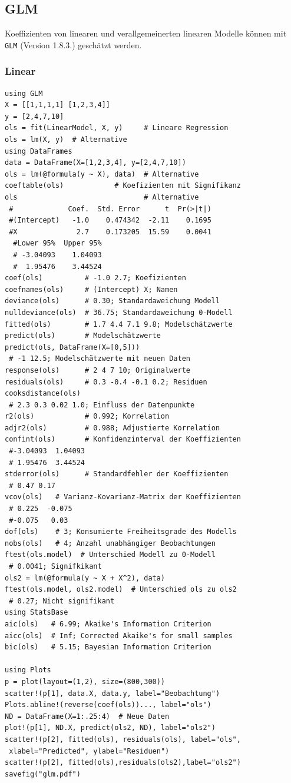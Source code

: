 \documentclass[10pt,twocolumn]{scrartcl}
\begin{document}
\subsection{GLM}

Koeffizienten von linearen und verallgemeinerten linearen Modelle können mit
\lstinline|GLM| (Version 1.8.3.) geschätzt werden.

\subsubsection{Linear}

\begin{lstlisting}
using GLM
X = [[1,1,1,1] [1,2,3,4]]
y = [2,4,7,10]
ols = fit(LinearModel, X, y)     # Lineare Regression
ols = lm(X, y)  # Alternative
using DataFrames
data = DataFrame(X=[1,2,3,4], y=[2,4,7,10])
ols = lm(@formula(y ~ X), data)  # Alternative
coeftable(ols)            # Koefizienten mit Signifikanz
ols                              # Alternative
 #             Coef.  Std. Error      t  Pr(>|t|)
 #(Intercept)   -1.0    0.474342  -2.11    0.1695
 #X              2.7    0.173205  15.59    0.0041
  #Lower 95%  Upper 95%
  # -3.04093    1.04093
  #  1.95476    3.44524
coef(ols)          # -1.0 2.7; Koefizienten
coefnames(ols)     # (Intercept) X; Namen
deviance(ols)      # 0.30; Standardaweichung Modell
nulldeviance(ols)  # 36.75; Standardaweichung 0-Modell
fitted(ols)        # 1.7 4.4 7.1 9.8; Modelschätzwerte
predict(ols)       # Modelschätzwerte
predict(ols, DataFrame(X=[0,5]))
 # -1 12.5; Modelschätzwerte mit neuen Daten
response(ols)      # 2 4 7 10; Originalwerte
residuals(ols)     # 0.3 -0.4 -0.1 0.2; Residuen
cooksdistance(ols)
 # 2.3 0.3 0.02 1.0; Einfluss der Datenpunkte
r2(ols)            # 0.992; Korrelation
adjr2(ols)         # 0.988; Adjustierte Korrelation
confint(ols)       # Konfidenzinterval der Koeffizienten
 #-3.04093  1.04093
 # 1.95476  3.44524
stderror(ols)      # Standardfehler der Koeffizienten
 # 0.47 0.17
vcov(ols)   # Varianz-Kovarianz-Matrix der Koeffizienten
 # 0.225  -0.075
 #-0.075   0.03
dof(ols)    # 3; Konsumierte Freiheitsgrade des Modells
nobs(ols)   # 4; Anzahl unabhängiger Beobachtungen
ftest(ols.model)  # Unterschied Modell zu 0-Modell
 # 0.0041; Signifkikant
ols2 = lm(@formula(y ~ X + X^2), data)
ftest(ols.model, ols2.model)  # Unterschied ols zu ols2
 # 0.27; Nicht signifikant
using StatsBase
aic(ols)   # 6.99; Akaike's Information Criterion
aicc(ols)  # Inf; Corrected Akaike's for small samples
bic(ols)   # 5.15; Bayesian Information Criterion

using Plots
p = plot(layout=(1,2), size=(800,300))
scatter!(p[1], data.X, data.y, label="Beobachtung")
Plots.abline!(reverse(coef(ols))..., label="ols")
ND = DataFrame(X=1:.25:4)  # Neue Daten
plot!(p[1], ND.X, predict(ols2, ND), label="ols2")
scatter!(p[2], fitted(ols), residuals(ols), label="ols",
 xlabel="Predicted", ylabel="Residuen")
scatter!(p[2], fitted(ols),residuals(ols2),label="ols2")
savefig("glm.pdf")
\end{lstlisting}
\end{document}
